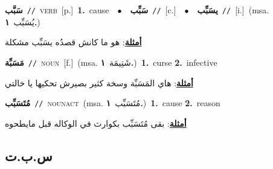 \documentclass[10pt,a4paper,twoside]{article} %
\begin{document}
\begin{multicols}{2}
{\setlength\topsep{0pt}\textbf{\foreignlanguage{arabic}{سَبَّب}}\ {\color{gray}\texttt{//}\color{black}}\ \textsc{verb}\ [p.]\ \textbf{1.}~cause\ \ $\bullet$\ \ \setlength\topsep{0pt}\textbf{\foreignlanguage{arabic}{سَبِّب}}\ {\color{gray}\texttt{//}\color{black}}\ [c.]\ \ $\bullet$\ \ \setlength\topsep{0pt}\textbf{\foreignlanguage{arabic}{يسَبِّب}}\ {\color{gray}\texttt{//}\color{black}}\ [i.]\ \color{gray}(msa. \foreignlanguage{arabic}{يُسَبِّب}~\foreignlanguage{arabic}{\textbf{١.}})\color{black}\  \begin{flushright}\color{gray}\foreignlanguage{arabic}{\textbf{\underline{\foreignlanguage{arabic}{أمثلة}}}: هو ما كانش قصدُه يسَبِّب مشكلة}\end{flushright}\color{black}} \vspace{2mm}

{\setlength\topsep{0pt}\textbf{\foreignlanguage{arabic}{مَسَبِّة}}\ {\color{gray}\texttt{//}\color{black}}\ \textsc{noun}\ [f.]\ \color{gray}(msa. \foreignlanguage{arabic}{شَتِيمَة}~\foreignlanguage{arabic}{\textbf{١.}})\color{black}\ \textbf{1.}~curse  \textbf{2.}~infective\  \begin{flushright}\color{gray}\foreignlanguage{arabic}{\textbf{\underline{\foreignlanguage{arabic}{أمثلة}}}: هاي المَسَبِّة وسخة كثير بصيرش تحكيها يا خالتي}\end{flushright}\color{black}} \vspace{2mm}

{\setlength\topsep{0pt}\textbf{\foreignlanguage{arabic}{مُتَسَبِّب}}\ {\color{gray}\texttt{//}\color{black}}\ \textsc{noun\textunderscore act}\ \color{gray}(msa. \foreignlanguage{arabic}{مُتَسَبِّب}~\foreignlanguage{arabic}{\textbf{١.}})\color{black}\ \textbf{1.}~cause  \textbf{2.}~reason\  \begin{flushright}\color{gray}\foreignlanguage{arabic}{\textbf{\underline{\foreignlanguage{arabic}{أمثلة}}}: بقى مُتَسَبِّب بكوارث في الوكاله قبل مايطحوه}\end{flushright}\color{black}} \vspace{2mm}

\vspace{-3mm}
\subsection*{\color{blue}\foreignlanguage{arabic}{س.ب.ت}\color{blue}{}} 


\end{multicols}
\end{document}
